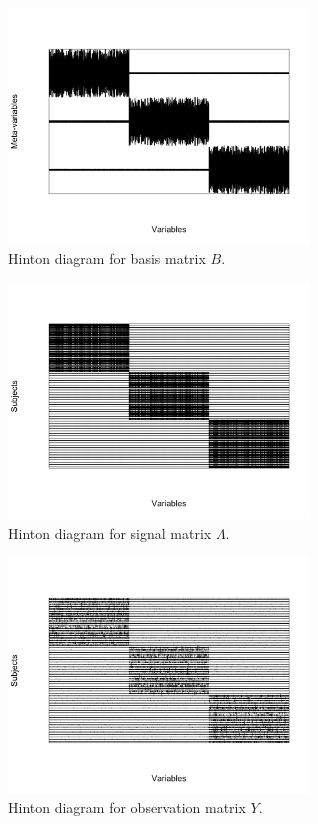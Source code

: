 \documentclass[]{article}
\begin{document}
\begin{figure}
	\centering
	\includegraphics[width=8cm]{b.png}
	\caption{Hinton diagram for basis matrix $B$.}
	\label{fig:B}
\end{figure}

\begin{figure}
	\centering
	\includegraphics[width=8cm]{lambda.png}
	\caption{Hinton diagram for signal matrix $\Lambda$.}
	\label{fig:lambda}
\end{figure}

\begin{figure}
	\centering
	\includegraphics[width=8cm]{Y.png}
	\caption{Hinton diagram for observation matrix $Y$.}
	\label{fig:Y}
\end{figure}
\end{document}
